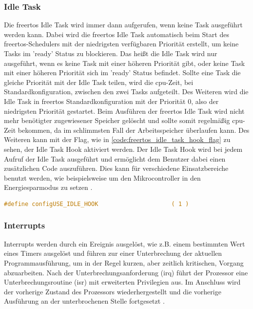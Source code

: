 \documentclass[../EDF Master Thesis.tex]{subfiles}
\begin{document}
\subsubsection{Idle Task} \label{section:idle_task}
Die \ac{freertos} Idle Task wird immer dann aufgerufen, wenn keine Task ausgeführt werden kann.
Dabei wird die \ac{freertos} Idle Task automatisch beim Start des \ac{freertos}-Schedulers mit der niedrigsten verfügbaren Priorität erstellt, um keine Tasks im 'ready' Status zu blockieren.
Das heißt die Idle Task wird nur ausgeführt, wenn es keine Task mit einer höheren Priorität gibt, oder keine Task mit einer höheren Priorität sich im 'ready' Status befindet.
Sollte eine Task die gleiche Priorität mit der Idle Task teilen, wird die \ac{cpu}-Zeit, bei Standardkonfiguration, zwischen den zwei Tasks aufgeteilt.
Des Weiteren wird die Idle Task in \ac{freertos} Standardkonfiguration mit der Priorität 0, also der niedrigsten Priorität gestartet.
Beim Ausführen der \ac{freertos} Idle Task wird nicht mehr benötigter zugewiesener Speicher gelöscht und sollte somit regelmäßig \ac{cpu}-Zeit bekommen, da im schlimmsten Fall der Arbeitsspeicher überlaufen kann.
Des Weiteren kann mit der Flag, wie in \autoref{code:freertos_idle_task_hook_flag} zu sehen, der Idle Task Hook aktiviert werden.
Der Idle Task Hook wird bei jedem Aufruf der Idle Task ausgeführt und ermöglicht dem Benutzer dabei einen zusätzlichen Code auszuführen.
Dies kann für verschiedene Einsatzbereiche benutzt werden, wie beispielsweise um den Mikrocontroller in den Energiesparmodus zu setzen \autocite{freertos_idle_task}.

\begin{lstlisting}[language=C, caption=FreeRTOS Idle Task Hook Flag, label=code:freertos_idle_task_hook_flag]
    #define configUSE_IDLE_HOOK                     ( 1 )
\end{lstlisting}


\subsubsection{Interrupts} \label{section:interrupts}
Interrupts werden durch ein Ereignis ausgelöst, wie z.B. einem bestimmten Wert eines Timers ausgelöst und führen zur einer Unterbrechung der aktuellen Programmausführung, um in der Regel kurzen, aber zeitlich kritischen, Vorgang abzuarbeiten.
Nach der Unterbrechungsanforderung (\ac{irq}) führt der Prozessor eine Unterbrechungsroutine (\ac{isr}) mit erweiterten Privilegien aus.
Im Anschluss wird der vorherige Zustand des Prozessors wiederhergestellt und die vorherige Ausführung an der unterbrochenen Stelle fortgesetzt \parencite{grundkurs_betriebssysteme, wiki:008}.
\end{document}
